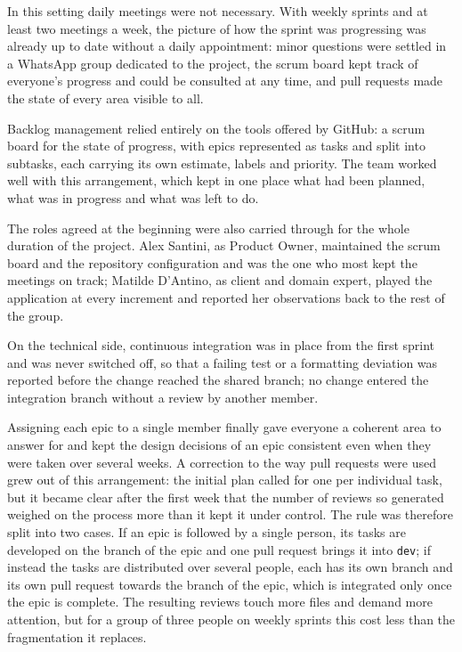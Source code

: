 In this setting daily meetings were not necessary. With weekly sprints and at least two meetings a week, the picture of
how the sprint was progressing was already up to date without a daily appointment: minor questions were settled in a
WhatsApp group dedicated to the project, the scrum board kept track of everyone's progress and could be consulted at
any time, and pull requests made the state of every area visible to all.

Backlog management relied entirely on the tools offered by GitHub: a scrum board for the state of progress, with epics
represented as tasks and split into subtasks, each carrying its own estimate, labels and priority. The team worked well
with this arrangement, which kept in one place what had been planned, what was in progress and what was left to do.

The roles agreed at the beginning were also carried through for the whole duration of the project. Alex Santini, as
Product Owner, maintained the scrum board and the repository configuration and was the one who most kept the meetings
on track; Matilde D'Antino, as client and domain expert, played the application at every increment and reported her
observations back to the rest of the group.

On the technical side, continuous integration was in place from the first sprint and was never switched off, so that a
failing test or a formatting deviation was reported before the change reached the shared branch; no change entered the
integration branch without a review by another member.

Assigning each epic to a single member finally gave everyone a coherent area to answer for and kept the design
decisions of an epic consistent even when they were taken over several weeks. A correction to the way pull requests
were used grew out of this arrangement: the initial plan called for one per individual task, but it became clear after
the first week that the number of reviews so generated weighed on the process more than it kept it under control. The
rule was therefore split into two cases. If an epic is followed by a single person, its tasks are developed on the
branch of the epic and one pull request brings it into \texttt{dev}; if instead the tasks are distributed over several
people, each has its own branch and its own pull request towards the branch of the epic, which is integrated only once
the epic is complete. The resulting reviews touch more files and demand more attention, but for a group of three people
on weekly sprints this cost less than the fragmentation it replaces.

